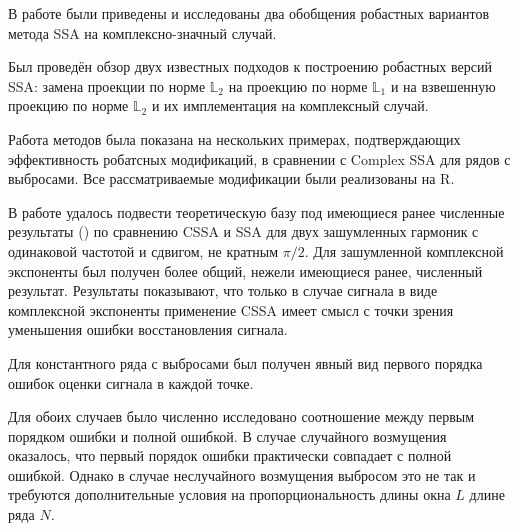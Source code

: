 \documentclass[specialist,
               substylefile = spbu.rtx,
               subf,href,colorlinks=true, 12pt]{disser}
\begin{document}


\conclusion
В работе были приведены и исследованы два обобщения робастных вариантов метода SSA на комплексно-значный случай. 

Был проведён обзор двух известных подходов к построению робастных версий SSA: замена проекции по норме $\mathbb{L}_2$ на проекцию по норме $\mathbb{L}_1$ и на взвешенную проекцию по норме $\mathbb{L}_2$ и их имплементация на комплексный случай.


Работа методов была показана на нескольких примерах, подтверждающих эффективность робатсных модификаций, в сравнении с Complex SSA для рядов с выбросами. Все рассматриваемые модификации были реализованы на R.

В работе удалось подвести теоретическую базу под имеющиеся ранее численные результаты (\cite{Golyandina.etal2013}) по сравнению CSSA и SSA для двух зашумленных гармоник с одинаковой частотой и сдвигом, не кратным $\pi/2$. Для зашумленной комплексной экспоненты был получен более общий, нежели имеющиеся ранее, численный результат.
Результаты показывают, что только в случае сигнала в виде комплексной экспоненты применение CSSA имеет смысл с точки зрения уменьшения ошибки восстановления сигнала.

Для константного ряда с выбросами был получен явный вид первого порядка ошибок оценки сигнала в каждой точке.

Для обоих случаев было численно исследовано соотношение между первым порядком ошибки и полной ошибкой.
В случае случайного возмущения оказалось, что первый порядок ошибки практически совпадает с полной ошибкой. Однако в случае неслучайного возмущения выбросом это не так и требуются дополнительные условия на пропорциональность длины окна $L$ длине ряда $N$.

\nocite{*}

    
\end{document}

